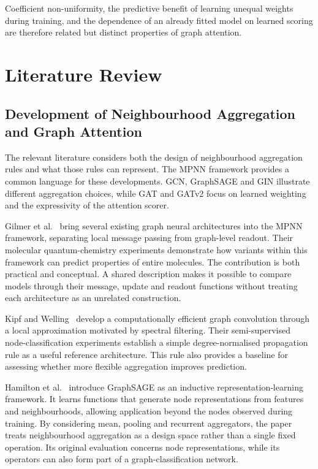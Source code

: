 \documentclass[11pt,a4paper]{article}
\begin{document}
Coefficient non-uniformity, the predictive benefit of learning unequal weights during training, and the dependence of an already fitted model on learned scoring are therefore related but distinct properties of graph attention.





\clearpage
\section{Literature Review}
\label{sec:literature}

\subsection{Development of Neighbourhood Aggregation and Graph Attention}
\label{sec:literature-aggregation}

The relevant literature considers both the design of neighbourhood aggregation rules and what those rules can represent. The MPNN framework provides a common language for these developments. GCN, GraphSAGE and GIN illustrate different aggregation choices, while GAT and GATv2 focus on learned weighting and the expressivity of the attention scorer.

Gilmer et al.~\cite{gilmer2017neural} bring several existing graph neural architectures into the MPNN framework, separating local message passing from graph-level readout. Their molecular quantum-chemistry experiments demonstrate how variants within this framework can predict properties of entire molecules. The contribution is both practical and conceptual. A shared description makes it possible to compare models through their message, update and readout functions without treating each architecture as an unrelated construction.

Kipf and Welling~\cite{kipf2017gcn} develop a computationally efficient graph convolution through a local approximation motivated by spectral filtering. Their semi-supervised node-classification experiments establish a simple degree-normalised propagation rule as a useful reference architecture. This rule also provides a baseline for assessing whether more flexible aggregation improves prediction.

Hamilton et al.~\cite{hamilton2017inductive} introduce GraphSAGE as an inductive representation-learning framework. It learns functions that generate node representations from features and neighbourhoods, allowing application beyond the nodes observed during training. By considering mean, pooling and recurrent aggregators, the paper treats neighbourhood aggregation as a design space rather than a single fixed operation. Its original evaluation concerns node representations, while its operators can also form part of a graph-classification network.
\end{document}
